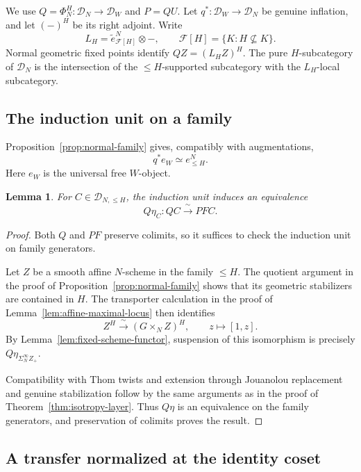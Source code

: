 \documentclass[11pt,reqno]{amsart}
\newtheorem{lemma}[theorem]{Lemma}
\theoremstyle{definition}
\theoremstyle{remark}
\theoremstyle{plain}
\numberwithin{equation}{section}
\newcommand{\D}{\mathcal D}
\begin{document}
We use \(Q=\Phi_N^H:\D_N\to\D_W\) and \(P=QU\).
Let \(q^*:\D_W\to\D_N\) be genuine inflation, and let
\((-)^H\) be its right adjoint. Write
\[
 L_H=\widetilde e_{\mathcal F[H]}^N\otimes-,
 \qquad \mathcal F[H]=\{K:H\nsubseteq K\}.
\]
Normal geometric fixed points identify \(QZ=(L_HZ)^H\).
The pure \(H\)-subcategory of \(\D_N\) is the intersection
of the \(\le H\)-supported subcategory with the \(L_H\)-local subcategory.

\subsection{The induction unit on a family}

Proposition~\ref{prop:normal-family} gives, compatibly with augmentations,
\begin{equation}\label{eq:td-normal-inflation}
 q^*e_W\simeq e_{\le H}^N.
\end{equation}
Here \(e_W\) is the universal free \(W\)-object.

\begin{lemma}\label{lem:td-induction-unit}
For \(C\in\mathcal D_{N,\le H}\), the induction unit induces an
equivalence
\[
 Q\eta_C:QC\xrightarrow{\ \sim\ }PFC.
\]
\end{lemma}

\begin{proof}
Both \(Q\) and \(PF\) preserve colimits, so it suffices to check
the induction unit on family generators.

Let \(Z\) be a smooth affine \(N\)-scheme in the family \(\le H\).
The quotient argument in the proof of
Proposition~\ref{prop:normal-family} shows that its geometric
stabilizers are contained in \(H\).
The transporter calculation in the proof of
Lemma~\ref{lem:affine-maximal-locus} then identifies
\[
 Z^H\xrightarrow{\ \sim\ }(G\times_N Z)^H,
 \qquad z\longmapsto[1,z].
\]
By Lemma~\ref{lem:fixed-scheme-functor}, suspension of this
isomorphism is precisely \(Q\eta_{\Sigma_N^\infty Z_+}\).

Compatibility with Thom twists and extension through Jouanolou
replacement and genuine stabilization follow by the same arguments
as in the proof of Theorem~\ref{thm:isotropy-layer}.
Thus \(Q\eta\) is an equivalence on the family generators,
and preservation of colimits proves the result.
\end{proof}

\subsection{A transfer normalized at the identity coset}
\end{document}
